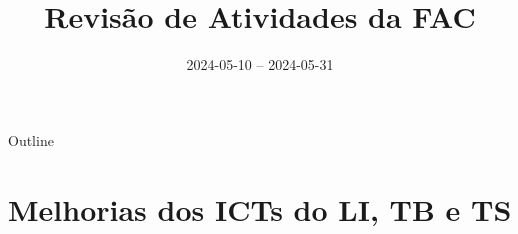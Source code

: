 \documentclass[aspectratio=169]{beamer}            %
\title{Revisão de Atividades da FAC}	%
\institute{LNLS.DAC.FAC}				%
\date{2024-05-10 -- 2024-05-31}			%
\begin{document}
\begin{frame}
  \titlepage
  \href{https://github.com/lnls-fac/doc-review-dac-fac}{}
  \href{https://www.overleaf.com/read/sbdjxtzfchrm}{}
\end{frame}

\begin{frame}{Outline}
  \tableofcontents
\end{frame}



\section{Melhorias dos ICTs do LI, TB e TS}
\end{document}
